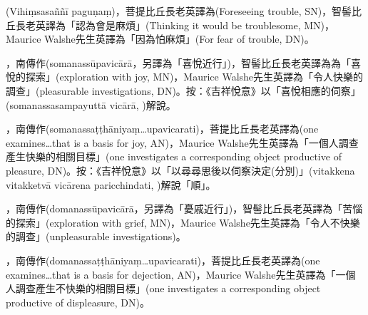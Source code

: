\startitemgroup[noteitems]
\item{}(Vihiṃsasaññī paguṇaṃ)，菩提比丘長老英譯為(Foreseeing trouble, SN)，智髻比丘長老英譯為「認為會是麻煩」(Thinking it would be troublesome, MN)，Maurice Walshe先生英譯為「因為怕麻煩」(For fear of trouble, DN)。
\stopitemgroup

\startitemgroup[noteitems]
\item{}，南傳作(somanassūpavicārā，另譯為「喜悅近行」)，智髻比丘長老英譯為為「喜悅的探索」(exploration with joy, MN)，Maurice Walshe先生英譯為「令人快樂的調查」(pleasurable investigations, DN)。按：《吉祥悅意》以「喜悅相應的伺察」(somanassasampayuttā vicārā, )解說。
\item{}，南傳作(somanassaṭṭhāniyaṃ…upavicarati)，菩提比丘長老英譯為(one examines…that is a basis for joy, AN)，Maurice Walshe先生英譯為「一個人調查產生快樂的相關目標」(one investigates a corresponding object productive of pleasure, DN)。按：《吉祥悅意》以「以尋尋思後以伺察決定(分別)」(vitakkena vitakketvā vicārena paricchindati, )解說「順」。
\stopitemgroup

\startitemgroup[noteitems]
\item{}，南傳作(domanassūpavicārā，另譯為「憂戚近行」)，智髻比丘長老英譯為「苦惱的探索」(exploration with grief, MN)，Maurice Walshe先生英譯為「令人不快樂的調查」(unpleasurable investigations)。
\item{}，南傳作(domanassaṭṭhāniyaṃ…upavicarati)，菩提比丘長老英譯為(one examines…that is a basis for dejection, AN)，Maurice Walshe先生英譯為「一個人調查產生不快樂的相關目標」(one investigates a corresponding object productive of displeasure, DN)。
\stopitemgroup

